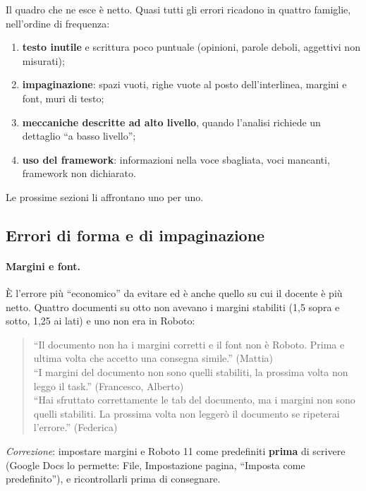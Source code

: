 Il quadro che ne esce è netto. Quasi tutti gli errori ricadono in quattro
famiglie, nell'ordine di frequenza:
\begin{enumerate}
  \item \textbf{testo inutile} e scrittura poco puntuale (opinioni, parole
        deboli, aggettivi non misurati);
  \item \textbf{impaginazione}: spazi vuoti, righe vuote al posto
        dell'interlinea, margini e font, muri di testo;
  \item \textbf{meccaniche descritte ad alto livello}, quando l'analisi
        richiede un dettaglio ``a basso livello'';
  \item \textbf{uso del framework}: informazioni nella voce sbagliata,
        voci mancanti, framework non dichiarato.
\end{enumerate}
Le prossime sezioni li affrontano uno per uno.

\subsection{Errori di forma e di impaginazione}
\label{rv:t1:sec:forma}

\paragraph{Margini e font.} È l'errore più ``economico'' da evitare ed è
anche quello su cui il docente è più netto. Quattro documenti su otto non
avevano i margini stabiliti (1,5 sopra e sotto, 1,25 ai lati) e uno non era in
Roboto:
\begin{quote}
  ``Il documento non ha i margini corretti e il font non è Roboto. Prima e
  ultima volta che accetto una consegna simile.'' (Mattia)\\
  ``I margini del documento non sono quelli stabiliti, la prossima volta non
  leggo il task.'' (Francesco, Alberto)\\
  ``Hai sfruttato correttamente le tab del documento, ma i margini non sono
  quelli stabiliti. La prossima volta non leggerò il documento se ripeterai
  l'errore.'' (Federica)
\end{quote}
\emph{Correzione}: impostare margini e Roboto 11 come predefiniti
\textbf{prima} di scrivere (Google Docs lo permette: File, Impostazione
pagina, ``Imposta come predefinito''), e ricontrollarli prima di consegnare.

